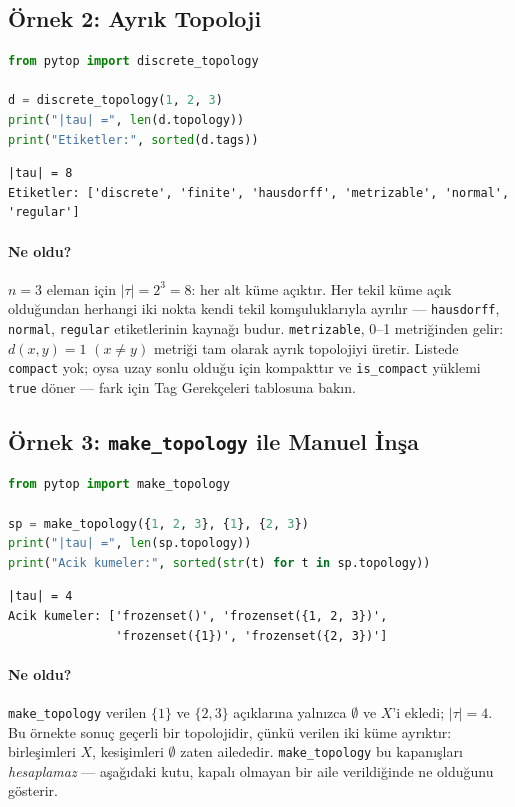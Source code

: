 \subsection{Örnek 2: Ayrık Topoloji}

\begin{lstlisting}[language=Python, caption={Ayrık topoloji}]
from pytop import discrete_topology

d = discrete_topology(1, 2, 3)
print("|tau| =", len(d.topology))
print("Etiketler:", sorted(d.tags))
\end{lstlisting}

\begin{lstlisting}[caption={Çıktı}]
|tau| = 8
Etiketler: ['discrete', 'finite', 'hausdorff', 'metrizable', 'normal', 'regular']
\end{lstlisting}

\paragraph{Ne oldu?}
$n=3$ eleman için $|\tau|=2^3=8$: her alt küme açıktır. Her tekil küme
açık olduğundan herhangi iki nokta kendi tekil komşuluklarıyla ayrılır
--- \texttt{hausdorff}, \texttt{normal}, \texttt{regular} etiketlerinin
kaynağı budur. \texttt{metrizable}, 0--1 metriğinden gelir:
$d(x,y)=1$ $(x\neq y)$ metriği tam olarak ayrık topolojiyi üretir.
Listede \texttt{compact} yok; oysa uzay sonlu olduğu için kompakttır ve
\texttt{is\_compact} yüklemi \texttt{true} döner --- fark için Tag
Gerekçeleri tablosuna bakın.

\subsection{Örnek 3: \texttt{make\_topology} ile Manuel İnşa}

\begin{lstlisting}[language=Python, caption={Manuel topoloji inşası}]
from pytop import make_topology

sp = make_topology({1, 2, 3}, {1}, {2, 3})
print("|tau| =", len(sp.topology))
print("Acik kumeler:", sorted(str(t) for t in sp.topology))
\end{lstlisting}

\begin{lstlisting}[caption={Çıktı}]
|tau| = 4
Acik kumeler: ['frozenset()', 'frozenset({1, 2, 3})',
               'frozenset({1})', 'frozenset({2, 3})']
\end{lstlisting}

\paragraph{Ne oldu?}
\texttt{make\_topology} verilen $\{1\}$ ve $\{2,3\}$ açıklarına yalnızca
$\emptyset$ ve $X$'i ekledi; $|\tau|=4$. Bu örnekte sonuç geçerli bir
topolojidir, çünkü verilen iki küme ayrıktır: birleşimleri $X$,
kesişimleri $\emptyset$ zaten ailededir. \texttt{make\_topology} bu
kapanışları \emph{hesaplamaz} --- aşağıdaki kutu, kapalı olmayan bir
aile verildiğinde ne olduğunu gösterir.

